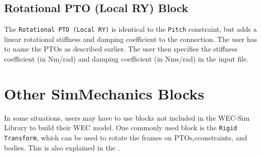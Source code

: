         \subsection{Rotational PTO (Local RY) Block}
        The \texttt{Rotational PTO (Local RY)} is identical to the \texttt{Pitch} constraint, 
                     but adds a linear rotational stiffness and damping coefficient to the connection. 
                     The user has to name the PTOs as described earlier. The user then specifies 
                     the stiffness coefficient (in Nm/rad) and damping coefficient (in Nms/rad) in the input file.

		
    \section{Other SimMechanics Blocks}
    In some situations, users may have to use \simmechanics blocks not included in
    the WEC-Sim Library to build their WEC model. One commonly used block is the \texttt{Rigid Transform}, 
    which can be used to rotate the frames on PTOs,cconstraints, and bodies. 
    This is also explained in the  \cite{simMechanics2014}.
